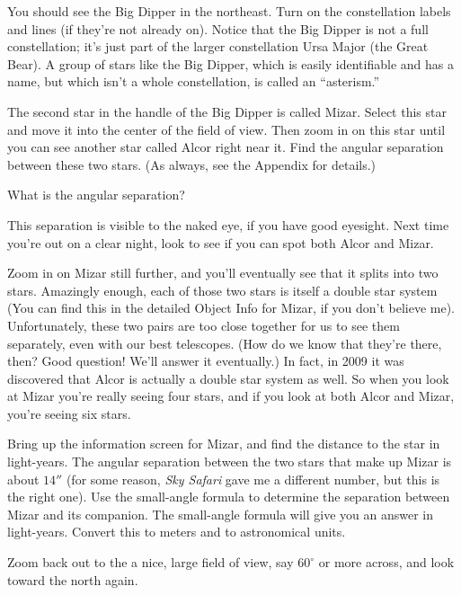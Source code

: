 You should see the Big Dipper in the northeast.
Turn
on the constellation labels and lines (if they're not already on).  
Notice that the Big
Dipper is not a full constellation; it's just part of the larger constellation
Ursa Major (the Great Bear).  A group of stars like the Big
Dipper, which is easily
identifiable and has a name, but which isn't a whole constellation,
is called an ``asterism.''  

The second star in the handle of the Big Dipper is called Mizar.
Select this star and move it into the center
of the field of view. 
Then zoom in on this star until you can see
another star called Alcor right near it.  Find the angular separation
between these two stars. (As always, see the Appendix for details.)

What is the angular separation?

\vskip 1in

This separation is visible to the naked eye, if you have good eyesight.
Next time you're out on a clear night, look to see if you can spot both
Alcor and Mizar.

Zoom in on Mizar still further, and you'll eventually see that it
splits into two stars. Amazingly enough, 
each of those two stars is itself a double
star system (You can find this in the detailed Object Info for
Mizar, if you don't believe me).
Unfortunately, these two pairs are too close together for us to 
see them separately, even with our best telescopes.  (How do we know
that they're there, then?  Good question! We'll answer it eventually.) 
In fact, in 2009 it was discovered that Alcor is actually a double
star system as well.
So when you look at Mizar you're really seeing four stars,
and if you look at both Alcor and Mizar, you're seeing six stars.

\vskip 1in

Bring up the information screen for Mizar, and 
find the distance to the star in light-years. The
angular separation between the two stars that make up Mizar is about
$14''$ (for some reason, \textit{Sky Safari} gave me a different
number, but this is the right one).
Use the small-angle formula to determine the separation between
Mizar and its companion.  The small-angle formula will give you
an answer in light-years.  Convert this to meters and to astronomical
units.


\vskip 2in
Zoom back out to the a nice, large field of view, say $60^\circ$ or more
across, and
look toward the north again.

\bigskip

